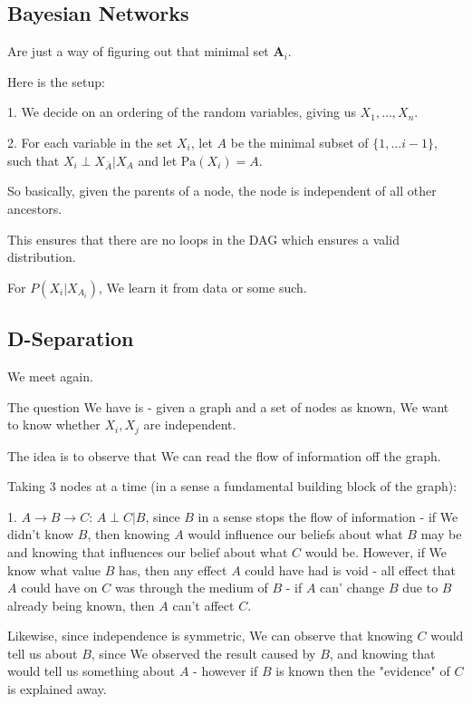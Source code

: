 \documentclass{article}
\begin{document}
	\subsection{Bayesian Networks}
	
		Are just a way of figuring out that minimal set $\mathbf{A}_i$.
		
		Here is the setup:
		
		1. We decide on an ordering of the random variables, giving us $X_1,\ldots,X_n$.
		
		2. For each variable in the set $X_i$, let $A$ be the minimal subset of $\{ 1,\ldots i-1 \}$, such that $X_i \perp X_{\bar{A}} | X_A$ and let $\text{Pa}(X_i) = A$.
		
		So basically, given the parents of a node, the node is independent of all other ancestors. 
		
		This ensures that there are no loops in the DAG which ensures a valid distribution. 
		
		For $P(X_i|X_{A_i})$, We learn it from data or some such. 
		
	\subsection{D-Separation}
	
		We meet again.
		
		The question We have is - given a graph and a set of nodes as known, We want to know whether $X_i, X_j$ are independent. 
		
		The idea is to observe that We can read the flow of information off the graph.
		
		Taking 3 nodes at a time (in a sense a fundamental building block of the graph):
		
		1. $A\to B\to C$:  $A\perp C | B$, since $B$ in a sense stops the flow of information - if We didn't know $B$, then knowing $A$ would influence our beliefs about what $B$ may be and knowing that influences our belief about what $C$ would be. However, if We know what value $B$ has, then any effect $A$ could have had is void - all effect that $A$ could have on $C$ was through the medium of $B$ - if $A$ can' change $B$ due to $B$ already being known, then $A$ can't affect $C$.
		
		Likewise, since independence is symmetric, We can observe that knowing $C$ would tell us about $B$, since We observed the result caused by $B$, and knowing that would tell us something about $A$ - however if $B$ is known then the "evidence" of $C$ is explained away.
		
\end{document}
